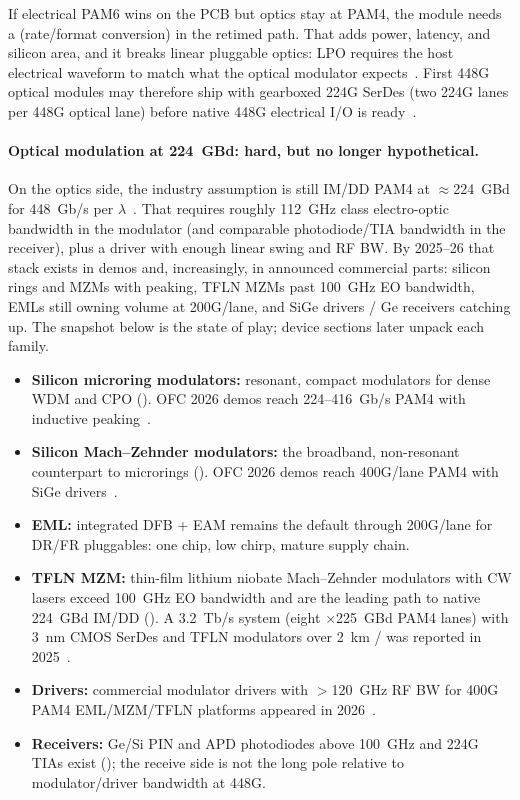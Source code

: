 If electrical PAM6 wins on the PCB but optics stay at PAM4, the module needs a
 (rate/format conversion) in the retimed path. That adds power,
latency, and silicon area, and it breaks linear pluggable optics: LPO requires the
host electrical waveform to match what the optical modulator expects~.
First 448G optical modules may therefore ship with gearboxed 224G SerDes (two 224G
lanes per 448G optical lane) before native 448G electrical I/O is
ready~.

\paragraph{Optical modulation at 224~GBd: hard, but no longer hypothetical.}

On the optics side, the industry assumption is still IM/DD PAM4 at $\approx$224~GBd
for 448~Gb/s per $\lambda$~. That requires roughly 112~GHz
class electro-optic bandwidth in the modulator (and comparable photodiode/TIA
bandwidth in the receiver), plus a driver with enough linear swing and RF BW.
By 2025--26 that stack exists in demos and, increasingly, in announced commercial
parts: silicon rings and MZMs with peaking, TFLN MZMs past 100~GHz EO bandwidth,
EMLs still owning volume at 200G/lane, and SiGe drivers / Ge receivers catching up.
The snapshot below is the state of play; device sections later unpack each family.

\begin{itemize}
  \item \textbf{Silicon microring modulators:} resonant, compact modulators for
        dense WDM and CPO (). OFC 2026 demos reach 224--416~Gb/s
        PAM4 with inductive peaking~.
  \item \textbf{Silicon Mach--Zehnder modulators:} the broadband, non-resonant
        counterpart to microrings (). OFC 2026 demos reach
        400G/lane PAM4 with SiGe drivers~.
  \item \textbf{EML:} integrated DFB + EAM remains the default through 200G/lane
        for DR/FR pluggables: one chip, low chirp, mature supply chain.
  \item \textbf{TFLN MZM:} thin-film lithium niobate Mach--Zehnder modulators with
        CW lasers exceed 100~GHz EO bandwidth and are the leading path to native
        224~GBd IM/DD (). A 3.2~Tb/s system (eight
        $\times$225~GBd PAM4 lanes) with 3~nm CMOS SerDes and TFLN modulators over
        2~km / was reported in 2025~.
  \item \textbf{Drivers:} commercial modulator drivers with $>$120~GHz RF BW for
        400G PAM4 EML/MZM/TFLN platforms appeared in 2026~.
  \item \textbf{Receivers:} Ge/Si PIN and APD photodiodes above 100~GHz and 224G
        TIAs exist (); the receive side is not the long pole relative
        to modulator/driver bandwidth at 448G.
\end{itemize}

